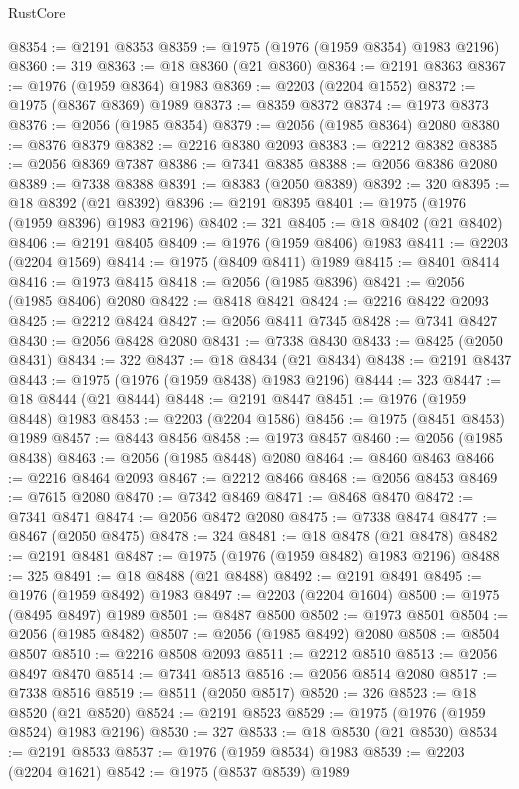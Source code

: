 \begin{lexlean}{RustCore}
\begin{coremodule}
@8354 := @2191 @8353
@8359 := @1975 (@1976 (@1959 @8354) @1983 @2196)
@8360 := 319
@8363 := @18 @8360 (@21 @8360)
@8364 := @2191 @8363
@8367 := @1976 (@1959 @8364) @1983
@8369 := @2203 (@2204 @1552)
@8372 := @1975 (@8367 @8369) @1989
@8373 := @8359 @8372
@8374 := @1973 @8373
@8376 := @2056 (@1985 @8354)
@8379 := @2056 (@1985 @8364) @2080
@8380 := @8376 @8379
@8382 := @2216 @8380 @2093
@8383 := @2212 @8382
@8385 := @2056 @8369 @7387
@8386 := @7341 @8385
@8388 := @2056 @8386 @2080
@8389 := @7338 @8388
@8391 := @8383 (@2050 @8389)
@8392 := 320
@8395 := @18 @8392 (@21 @8392)
@8396 := @2191 @8395
@8401 := @1975 (@1976 (@1959 @8396) @1983 @2196)
@8402 := 321
@8405 := @18 @8402 (@21 @8402)
@8406 := @2191 @8405
@8409 := @1976 (@1959 @8406) @1983
@8411 := @2203 (@2204 @1569)
@8414 := @1975 (@8409 @8411) @1989
@8415 := @8401 @8414
@8416 := @1973 @8415
@8418 := @2056 (@1985 @8396)
@8421 := @2056 (@1985 @8406) @2080
@8422 := @8418 @8421
@8424 := @2216 @8422 @2093
@8425 := @2212 @8424
@8427 := @2056 @8411 @7345
@8428 := @7341 @8427
@8430 := @2056 @8428 @2080
@8431 := @7338 @8430
@8433 := @8425 (@2050 @8431)
@8434 := 322
@8437 := @18 @8434 (@21 @8434)
@8438 := @2191 @8437
@8443 := @1975 (@1976 (@1959 @8438) @1983 @2196)
@8444 := 323
@8447 := @18 @8444 (@21 @8444)
@8448 := @2191 @8447
@8451 := @1976 (@1959 @8448) @1983
@8453 := @2203 (@2204 @1586)
@8456 := @1975 (@8451 @8453) @1989
@8457 := @8443 @8456
@8458 := @1973 @8457
@8460 := @2056 (@1985 @8438)
@8463 := @2056 (@1985 @8448) @2080
@8464 := @8460 @8463
@8466 := @2216 @8464 @2093
@8467 := @2212 @8466
@8468 := @2056 @8453
@8469 := @7615 @2080
@8470 := @7342 @8469
@8471 := @8468 @8470
@8472 := @7341 @8471
@8474 := @2056 @8472 @2080
@8475 := @7338 @8474
@8477 := @8467 (@2050 @8475)
@8478 := 324
@8481 := @18 @8478 (@21 @8478)
@8482 := @2191 @8481
@8487 := @1975 (@1976 (@1959 @8482) @1983 @2196)
@8488 := 325
@8491 := @18 @8488 (@21 @8488)
@8492 := @2191 @8491
@8495 := @1976 (@1959 @8492) @1983
@8497 := @2203 (@2204 @1604)
@8500 := @1975 (@8495 @8497) @1989
@8501 := @8487 @8500
@8502 := @1973 @8501
@8504 := @2056 (@1985 @8482)
@8507 := @2056 (@1985 @8492) @2080
@8508 := @8504 @8507
@8510 := @2216 @8508 @2093
@8511 := @2212 @8510
@8513 := @2056 @8497 @8470
@8514 := @7341 @8513
@8516 := @2056 @8514 @2080
@8517 := @7338 @8516
@8519 := @8511 (@2050 @8517)
@8520 := 326
@8523 := @18 @8520 (@21 @8520)
@8524 := @2191 @8523
@8529 := @1975 (@1976 (@1959 @8524) @1983 @2196)
@8530 := 327
@8533 := @18 @8530 (@21 @8530)
@8534 := @2191 @8533
@8537 := @1976 (@1959 @8534) @1983
@8539 := @2203 (@2204 @1621)
@8542 := @1975 (@8537 @8539) @1989

\end{coremodule}
\end{lexlean}
